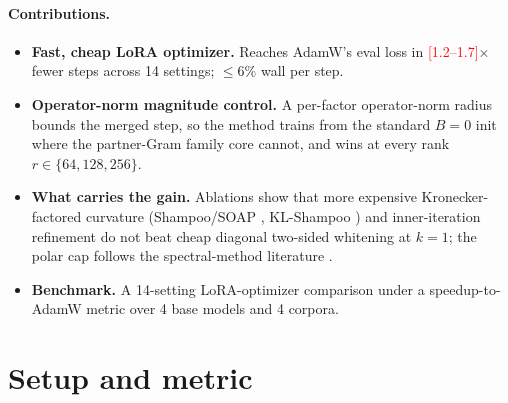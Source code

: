 \documentclass[11pt]{article}
\newcommand{\PLACEHOLDER}[1]{\textcolor{red}{[#1]}}
\theoremstyle{plain}
\theoremstyle{definition}
\theoremstyle{remark}
\begin{document}
\paragraph{Contributions.}
\begin{itemize}[leftmargin=1.5em,itemsep=2pt,topsep=2pt]
  \item \textbf{Fast, cheap LoRA optimizer.} Reaches AdamW's eval loss in
        \PLACEHOLDER{1.2--1.7}$\times$ fewer steps across 14 settings; $\le 6\%$
        wall per step.
  \item \textbf{Operator-norm magnitude control.} A per-factor operator-norm radius
        bounds the merged step, so the method trains from the standard $B{=}0$ init
        where the partner-Gram family core cannot, and wins at every rank
        $r\in\{64,128,256\}$.
  \item \textbf{What carries the gain.} Ablations show that more expensive
        Kronecker-factored curvature (Shampoo/SOAP \cite{soap}, KL-Shampoo
        \cite{klshampoo}) and inner-iteration refinement do not beat cheap diagonal
        two-sided whitening at $k{=}1$; the polar cap follows the spectral-method
        literature \cite{imuon, spectron, polarexpress}.
  \item \textbf{Benchmark.} A 14-setting LoRA-optimizer comparison under a
        speedup-to-AdamW metric over 4 base models and 4 corpora.
\end{itemize}


\section{Setup and metric}
\label{sec:setup}

\end{document}
